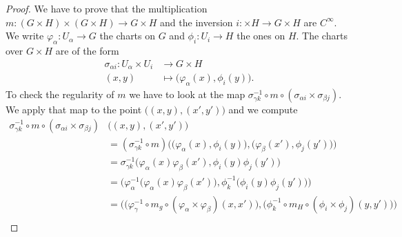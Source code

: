 \begin{proof}

	We have to prove that the multiplication \(m \colon (G\times H)\times (G\times H)\to G\times H  \) and the inversion \(i \colon \times H\to G\times H  \) are \( C^{\infty}\). We write \(\varphi_{\alpha} \colon U_{\alpha}\to G  \) the charts on \( G\) and \(\phi_i \colon U_i\to H  \) the ones on \( H\). The charts over \( G\times H\) are of the form
	\begin{equation}
		\begin{aligned}
			\sigma_{\alpha i}\colon U_{\alpha}\times U_i & \to G\times H                                      \\
			(x,y)                                        & \mapsto \big( \varphi_{\alpha}(x),\phi_i(y) \big).
		\end{aligned}
	\end{equation}
	To check the regularity of \( m\) we have to look at the map \( \sigma^{-1}_{\gamma k}\circ m\circ(\sigma_{\alpha i}\times \sigma_{\beta j})\). We apply that map to the point \(   \big( (x,y),(x',y') \big)  \) and we compute
	\begin{subequations}
		\begin{align}
			\sigma^{-1}_{\gamma k}\circ m\circ (\sigma_{\alpha i}\times \sigma_{\beta j}) & \big( (x,y),(x',y') \big)                                                                                                                                                                   \\
			                                                                              & =(\sigma^{-1}_{\gamma k}\circ m)\Big( \big( \varphi_{\alpha}(x),\phi_i(y) \big),\big( \varphi_{\beta}(x'),\phi_j(y') \big) \Big)                                                            \\
			                                                                              & =\sigma_{\gamma k}^{-1}\Big( \varphi_{\alpha}(x)\varphi_{\beta}(x'),\phi_i(y)\phi_j(y') \Big)                                                                                               \\
			                                                                              & = \Big( \varphi_{\alpha}^{-1}\big( \varphi_{\alpha}(x)\varphi_{\beta}(x') \big),   \phi_k^{-1}\big( \phi_i(y)\phi_j(y') \big) \Big)                                                         \\
			                                                                              & = \Big( \big( \varphi_{\gamma}^{-1}\circ m_g\circ (\varphi_{\alpha}\times \varphi_{\beta})(x,x') \big),\big( \phi_k^{-1}\circ m_H\circ(\phi_i\times \phi_j)(y,y') \big) \Big)               \\

\end{align}
\end{subequations}
\end{proof}
